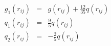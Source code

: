\documentclass[preview]{standalone}
\begin{document}
\begin{varwidth}{50in}
  \begin{eqnarray}
    g_1(r_{ij}) &=& g(r_{ij}) + \frac{12}{35} q(r_{ij}) \nonumber \\
    q_1(r_{ij}) &=& \frac{9}{5} q(r_{ij}) \nonumber \\
    q_2(r_{ij}) &=& - \frac{2}{5} q(r_{ij}) \nonumber
  \end{eqnarray}
\end{varwidth}
\end{document}
